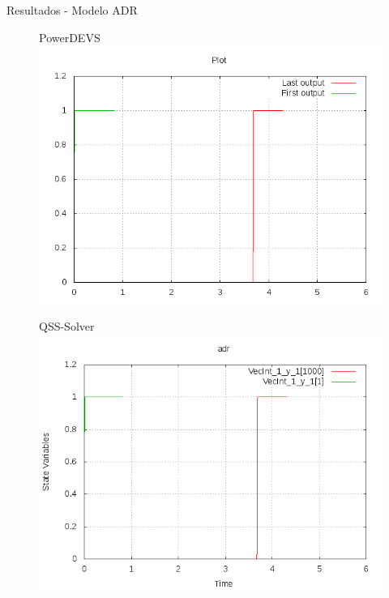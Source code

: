 \documentclass{beamer}
\begin{document}
\begin{frame}{Resultados - Modelo ADR}
\begin{figure}[H]
\begin{minipage}{0.5\textwidth}
\centering
PowerDEVS \\
 \includegraphics[width=\linewidth]{output/adr/adr-pd}
\end{minipage}\hfill\begin{minipage}{0.5\textwidth}
\centering
QSS-Solver \\
 \includegraphics[width=\linewidth]{output/adr/adr-qss}
\end{minipage}
\end{figure}
\end{frame}
\end{document}
